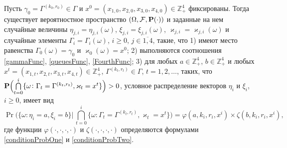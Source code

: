 \documentclass[a4paper,12pt,russian]{extarticle}
\begin{document}
\begin{theorem}
Пусть $\gamma_0=\Gamma^{(k_0,r_0)}\in \Gamma$ и $x^0=(x_{1,0},x_{2,0}, x_{3,0},x_{4,0})\in \mathbb{Z}_+^4$ фиксированы.
Тогда существует вероятностное пространство $(\Omega, {\cal F}, \Pr(\cdot))$ и заданные на нем случайные величины $\eta_{j,i}=\eta_{j,i}(\omega)$, $\xi_{j,i}=\xi_{j,i}(\omega)$, 	 $\varkappa_{j,i}=\varkappa_{j,i}(\omega)$ и случайные элементы $\Gamma_i=\Gamma_i(\omega)$, $i\geqslant 0$, $j\in \overline{1,4}$, такие, что 1) имеют место равенства $\Gamma_0(\omega) = \gamma_0$ и $\varkappa_0(\omega)=x^0$; 2) выполняются соотношения \eqref{gammaFunc}, \eqref{queuesFunc}, \eqref{FourthFunc}; 3) для любых  $a\in \mathbb{Z}_+^4$, $b\in \mathbb{Z}_+^4$ и любых $x^t=(x_{1,t},x_{2,t},x_{3,t},x_{4,t}) \in \mathbb{Z}_+^4$, $\Gamma^{(k_t,r_t)} \in \Gamma$, $t = 1, 2, \ldots$, таких, что $\Pr\Bigl(\bigcap\limits_{t=0}^{i}\{\omega\colon \Gamma_t=\Gamma^{(k_t,r_t)}, \varkappa_t=x^t\}\Bigr)>0$, условное распределение векторов $\eta_i$ и $\xi_i$, $i \geqslant 0$,  имеет вид
\begin{equation}
\Pr \biggl(\{ \omega \colon \eta_i = a, \xi_i=b\} \bigg
|\,\bigcap_{t=0}^{i}\{\omega\colon \Gamma_t=\Gamma^{(k_t,r_t)}, \varkappa_t=x^t\}\biggr)=
\varphi(a,k_i,r_i,x^i)\times \zeta(b,k_i,r_i,x^i),
\label{ProbablititiesToProve}
\end{equation}
где функции $\varphi(\cdot, \cdot, \cdot, \cdot)$ и $\zeta(\cdot, \cdot, \cdot, \cdot)$ определяются формулами \eqref{conditionProbOne} и \eqref{conditionProbTwo}.

\label{myTheorem}
\end{theorem}
\end{document}
